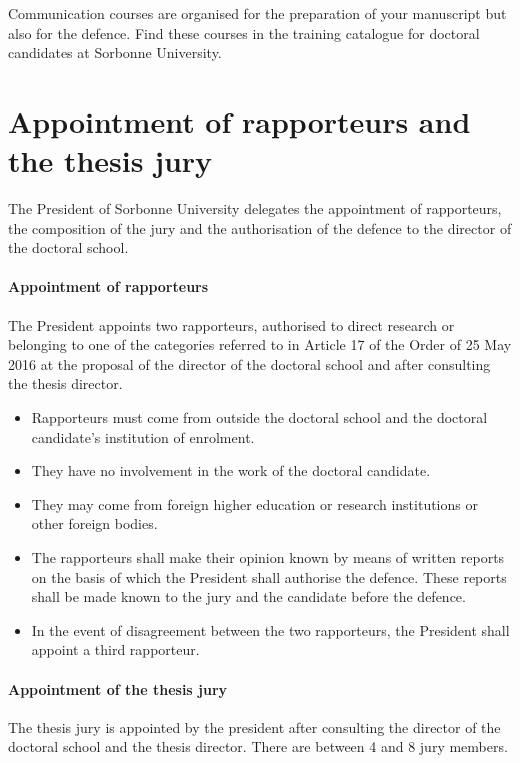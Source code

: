 Communication courses are organised for the preparation of your manuscript but also for the defence. Find these courses in the training catalogue for doctoral candidates at Sorbonne University. 

\section{Appointment of rapporteurs and the thesis jury}
\label{sec:appointment-of-rapporteurs}

The President of Sorbonne University delegates the appointment of rapporteurs, the composition of the jury and the authorisation of the defence to the director of the doctoral school.

\paragraph{Appointment of rapporteurs}

The President appoints two rapporteurs, authorised to direct research or belonging to one of the categories referred to in Article 17 of the Order of 25 May 2016 at the proposal of the director of the doctoral school and after consulting the thesis director.

\begin{itemize}
    \item Rapporteurs must come from outside the doctoral school and the doctoral candidate's institution of enrolment.
    \item They have no involvement in the work of the doctoral candidate.
    \item They may come from foreign higher education or research institutions or other foreign bodies.
    \item The rapporteurs shall make their opinion known by means of written reports on the basis of which the President shall authorise the defence. These reports shall be made known to the jury and the candidate before the defence.
    \item In the event of disagreement between the two rapporteurs, the President shall appoint a third rapporteur.
\end{itemize}

\paragraph{Appointment of the thesis jury}

The thesis jury is appointed by the president after consulting the director of the doctoral school and the thesis director.
There are between 4 and 8 jury members.

